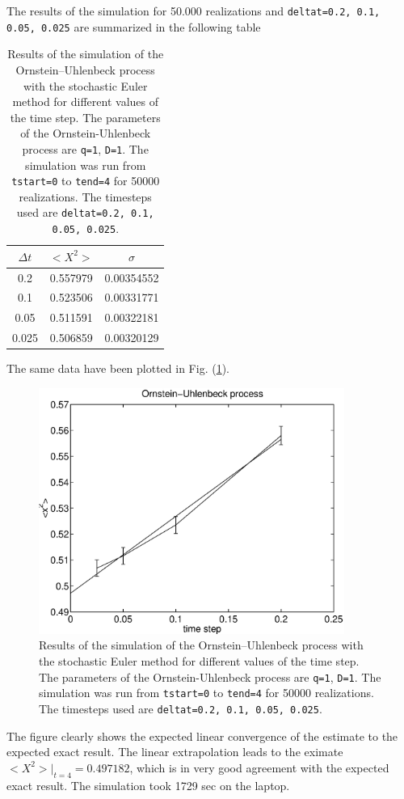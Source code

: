 The results of the simulation for 50.000 realizations 
and \texttt{deltat=0.2, 0.1, 0.05, 0.025} are summarized in the following 
table 
\begin{table}
\caption{Results of the simulation of the Ornstein--Uhlenbeck 
process with the stochastic Euler method for different values of 
the time step. The parameters of the Ornstein-Uhlenbeck process
are \texttt{q=1}, \texttt{D=1}. The simulation was run from
\texttt{tstart=0} to \texttt{tend=4} for 50000 realizations.
The timesteps used are \texttt{deltat=0.2, 0.1, 0.05, 0.025}.}
\begin{center}
\begin{tabular}{|c|c|c|} \hline \hline
$\Delta t$ & $<X^2>$ & $\sigma$ \\ \hline \hline
0.2      & 0.557979 & 0.00354552 \\ \hline
0.1      & 0.523506 & 0.00331771  \\ \hline
0.05     & 0.511591 & 0.00322181  \\ \hline
0.025    & 0.506859 & 0.00320129  \\ \hline \hline
\end{tabular}
\end{center}
\end{table}
The same data have been plotted in Fig. (\ref{F_SDEORN_50}).
\begin{figure}
\label{F_SDEORN_50}
\includegraphics[width=10cm]{./Figures/f_sdeorn_50.eps}
\caption{Results of the simulation of the Ornstein--Uhlenbeck 
process with the stochastic Euler method for different values of 
the time step. The parameters of the Ornstein-Uhlenbeck process
are \texttt{q=1}, \texttt{D=1}. The simulation was run from
\texttt{tstart=0} to \texttt{tend=4} for 50000 realizations.
The timesteps used are \texttt{deltat=0.2, 0.1, 0.05, 0.025}.} 
\end{figure}
The figure clearly shows the expected linear convergence of the 
estimate to the expected exact result. The linear extrapolation 
leads to the eximate $<X^2>|_{t=4}=0.497182$, which is in very 
good agreement with the expected exact result. The simulation took
1729 sec on the laptop.

